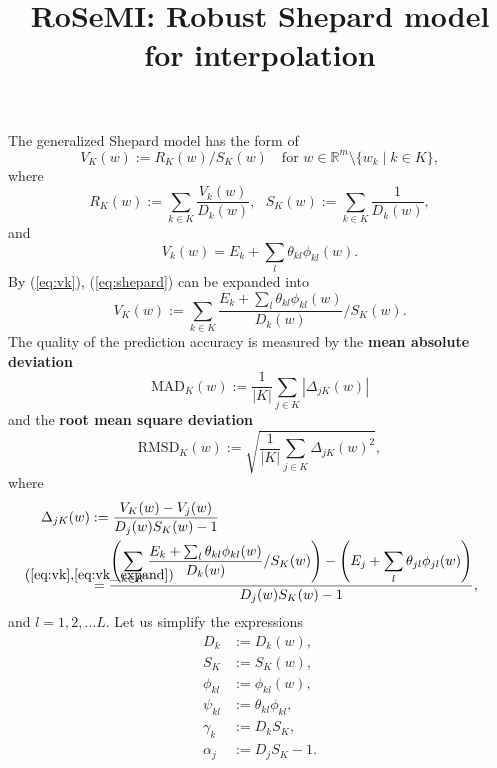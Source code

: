 \documentclass[12pt]{article}
\title{RoSeMI: Robust Shepard model for interpolation}
\newcommand{\defeq}[2]{\stackrel{\mathclap{\normalfont\mbox{#1}}}{#2}}
\def\D{\displaystyle}
\begin{document}
\maketitle
The generalized Shepard model has the form of 
\begin{equation}
    \label{eq:shepard}
    V_K(w):=R_K(w)/S_K(w) ~~~ \text{ for } w \in \mathbb{R}^m \setminus \{w_k\mid k\in K \},
\end{equation}
where
\begin{equation}
    R_K(w):=\sum_{k\in K} \frac{V_k(w)}{D_k(w)},~~~
    S_K(w):=\sum_{k\in K} \frac{1}{D_k(w)},
\end{equation}
and
\begin{equation}
    \label{eq:vk}
    V_k(w) = E_k + \sum_l \theta_{kl} \phi_{kl}(w).
\end{equation}
By (\ref{eq:vk}), (\ref{eq:shepard}) can be expanded into
\begin{equation}
    \label{eq:vk_expand}
    V_K(w) := \sum_{k\in K} \frac{E_k + \sum_l \theta_{kl} \phi_{kl}(w)}{D_k(w)} / S_K(w). 
\end{equation}
The quality of the prediction accuracy is measured by the \textbf{mean absolute deviation}
\begin{equation}
    \text{MAD}_K(w) := \frac{1}{|K|}\sum_{j\in K}|\Delta_{jK}(w)|
\end{equation}
and the \textbf{root mean square deviation}
\begin{equation}
    \text{RMSD}_K(w) := \sqrt{\frac{1}{|K|}\sum_{j\in K}\Delta_{jK}(w)^2},
\end{equation}
where
\begin{equation}
    \label{eq:delta}
    \begin{split}
        \Delta_{jK}(w)&:=\D\frac{V_K(w)-V_j(w)}{D_j(w)S_K(w)-1} \\
        &\defeq{(\refeq{eq:vk},\refeq{eq:vk_expand})}{=} \frac{\D \left(\sum_{k\in K} \frac{E_k + \sum_l \theta_{kl} \phi_{kl}(w)}{D_k(w)} / S_K(w)\right) - \left(E_j + \sum_l \theta_{jl} \phi_{jl}(w)\right)}{D_j(w)S_K(w)-1}, \\
    \end{split}
\end{equation}
and $l=1,2,...L$.
Let us simplify the expressions
\begin{equation*}
	\label{eq:simp}
    \begin{split}
        D_k &:= D_k(w), \\
        S_K &:= S_K(w), \\
        \phi_{kl} &:= \phi_{kl}(w),\\
        \psi_{kl} &:= \theta_{kl}\phi_{kl}, \\
        \gamma_k &:= D_kS_K, \\
        \alpha_j &:= D_jS_K-1.
    \end{split}
\end{equation*}
\end{document}

